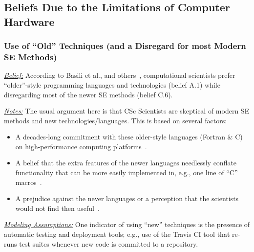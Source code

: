 \documentclass[conference,10pt]{IEEEtran}
\begin{document}
 \subsection{Beliefs Due  to the  Limitations of Computer Hardware}






\subsubsection{Use of ``Old'' Techniques (and a Disregard for  most Modern SE Methods)}\label{lang}


\noindent \textit{\underline{Belief:}} According to Basili et al., and others~\cite{basili08_hpc, carver07_environment, Prabhu11_cssurvey, kendall05_C, ragan14_pythoncs},
computational scientists prefer
``older''-style programming languages and technologies (belief A.1) while disregarding most of the newer SE methods (belief C.6).

\noindent \textit{\underline{Notes:}} The usual argument here is that CSc Scientists are skeptical of modern SE methods and new technologies/languages.
This is based on several factors: 
\begin{itemize}
  \item A decades-long commitment with these older-style languages (Fortran \& C) on high-performance computing platforms~\cite{faulk09_secs}.
  \item A belief that the extra features of the newer languages needlessly conflate functionality that can be more easily implemented in, e.g., one line of ``C'' macros~\cite{sanders08_risk}. 
  \item A prejudice against the never languages or a perception that the scientists would not find then useful~\cite{Prabhu11_cssurvey}. 
\end{itemize}



\noindent \textit{\underline{Modeling Assumptions:}} 
One indicator of using ``new'' techniques is the presence of automatic testing and deployment tools; e.g., use of the Travis CI tool that re-runs test suites whenever new code is committed to a repository. 
\end{document}
